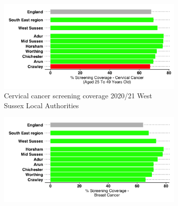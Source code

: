 
\begin{figure}
    \caption[Cancer screening rates in West Sussex and its consituent lower tier local authorities.]{The screening rate at county-level for {\bf cervical cancer} (in women aged 25-49 years) is 72.2\% (Crawley, 67.3\%). Uptake had reached a 20-year low in 2018, although promotional campaigns have contributed to increases since. For {\bf breast cancer}, the screening rate at county-level is 73.1\% (Screening rates are higher than England for all districts and boroughs in West Sussex, though rates are lowest in Crawley, 65.0\%). Recent issues with the West Sussex breast programme's round length may explain the decline in screening coverage. The screening rate at county-level for {\bf bowel cancer} is 69.4\% (Crawley, 64.7\%).}\label{fig:cancer-screening}
    \vspace*{5mm}
    \centering
    \begin{subfigure}[b]{0.32\textwidth}
        \centering
        \includegraphics[width=\textwidth]{images/cervical_cancer_rag_bar.png}
        \caption{Cervical cancer screening coverage 2020/21 West Sussex Local Authorities}
        \label{fig:cervical:rag}
    \end{subfigure}
    \begin{subfigure}[b]{0.32\textwidth}
        \centering
        \includegraphics[width=\textwidth]{images/breast_cancer_rag_bar.png}

\end{subfigure}
\end{figure}
